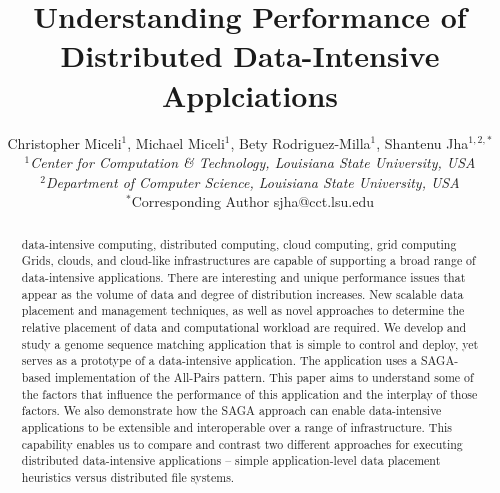 \documentclass{rspublic}
\title[Understanding Performance of Distributed Data-Intensive
Applciations]{Understanding Performance of Distributed Data-Intensive
  Applciations}
\author[Miceli, Miceli, Rodriguez-Milla, Jha]{ Christopher Miceli$^{1}$,
Michael Miceli$^{1}$, Bety Rodriguez-Milla$^{1}$, Shantenu Jha$^{1,2,*}$ \\
\small{\emph{$^{1}$Center for Computation \& Technology, Louisiana State
University, USA}} \\  \small{\emph{$^{2}$Department of Computer Science,
Louisiana State University, USA}} \\ {\footnotesize {\hspace{0.0 in}
$^*$Corresponding Author sjha@cct.lsu.edu}} }
\begin{document}
 \maketitle

\begin{abstract}{data-intensive computing, distributed computing,
cloud computing, grid computing} 
Grids, clouds, and cloud-like infrastructures are capable of
supporting a broad range of data-intensive applications. There are
interesting and unique performance issues that appear as the volume of
data and degree of distribution increases. New scalable data placement
and management techniques, as well as novel approaches to determine
the relative placement of data and computational workload are
required.  We develop and study a genome sequence matching application
that is simple to control and deploy, yet serves as a prototype of a
data-intensive application. The application uses a SAGA-based
implementation of the All-Pairs pattern.  This paper aims to
understand some of the factors that influence the performance of this
application and the interplay of those factors. We also demonstrate
how the SAGA approach can enable data-intensive applications to be
extensible and interoperable over a range of infrastructure. This
capability enables us to compare and contrast two different approaches
for executing distributed data-intensive applications -- simple
application-level data placement heuristics versus distributed file
systems.


\end{abstract}
\end{document}
